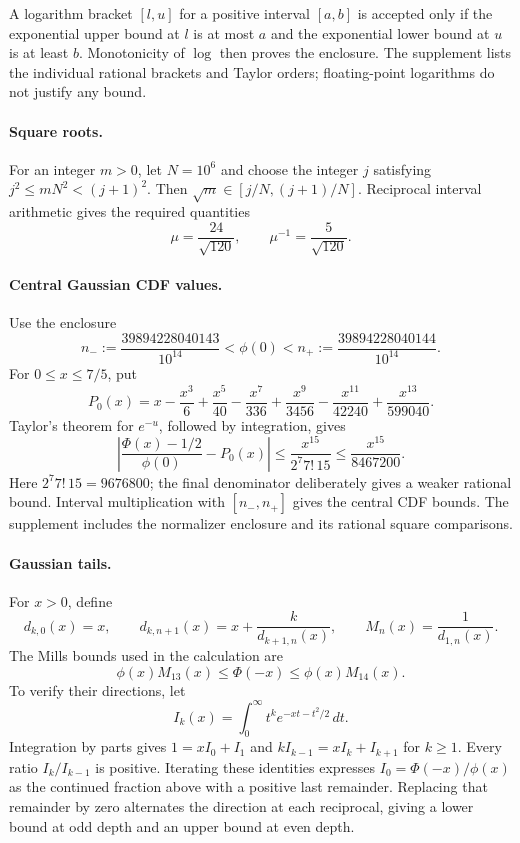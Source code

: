 \documentclass[11pt]{article}
\theoremstyle{remark}
\begin{document}
A logarithm bracket $[l,u]$ for a positive interval $[a,b]$ is accepted only
if the exponential upper bound at $l$ is at most $a$ and the exponential
lower bound at $u$ is at least $b$. Monotonicity of $\log$ then proves the
enclosure. The supplement lists the individual rational brackets and Taylor
orders; floating-point logarithms do not justify any bound.

\paragraph{Square roots.}
For an integer $m>0$, let $N=10^6$ and choose the integer $j$ satisfying
$j^2\leq mN^2<(j+1)^2$. Then
$\sqrt m\in[j/N,(j+1)/N]$. Reciprocal interval arithmetic gives the required
quantities
\[
 \mu=\frac{24}{\sqrt{120}},\qquad
 \mu^{-1}=\frac5{\sqrt{120}}.
\]

\paragraph{Central Gaussian CDF values.}
Use the enclosure
\[
 n_-:=\frac{39894228040143}{10^{14}}
 <\phi(0)<
 n_+:=\frac{39894228040144}{10^{14}}.
\]
For $0\leq x\leq7/5$, put
\[
 P_0(x)=x-\frac{x^3}{6}+\frac{x^5}{40}-\frac{x^7}{336}
       +\frac{x^9}{3456}-\frac{x^{11}}{42240}+\frac{x^{13}}{599040}.
\]
Taylor's theorem for $e^{-u}$, followed by integration, gives
\[
 \left|\frac{\Phi(x)-1/2}{\phi(0)}-P_0(x)\right|
 \leq\frac{x^{15}}{2^7 7!\,15}
 \leq\frac{x^{15}}{8467200}.
\]
Here $2^7 7!\,15=9676800$; the final denominator deliberately gives a
weaker rational bound. Interval multiplication with $[n_-,n_+]$ gives the central CDF bounds.
The supplement includes the normalizer enclosure and its rational square
comparisons.

\paragraph{Gaussian tails.}
For $x>0$, define
\[
 d_{k,0}(x)=x,\qquad
 d_{k,n+1}(x)=x+\frac{k}{d_{k+1,n}(x)},\qquad
 M_n(x)=\frac1{d_{1,n}(x)}.
\]
The Mills bounds used in the calculation are
\[
 \phi(x)M_{13}(x)\leq\Phi(-x)\leq\phi(x)M_{14}(x).
\]
To verify their directions, let
\[
 I_k(x)=\int_0^\infty t^k e^{-xt-t^2/2}\,dt.
\]
Integration by parts gives $1=xI_0+I_1$ and
$kI_{k-1}=xI_k+I_{k+1}$ for $k\geq1$. Every ratio $I_k/I_{k-1}$ is positive.
Iterating these identities expresses $I_0=\Phi(-x)/\phi(x)$ as the continued
fraction above with a positive last remainder. Replacing that remainder by
zero alternates the direction at each reciprocal, giving a lower bound at
odd depth and an upper bound at even depth.
\end{document}
